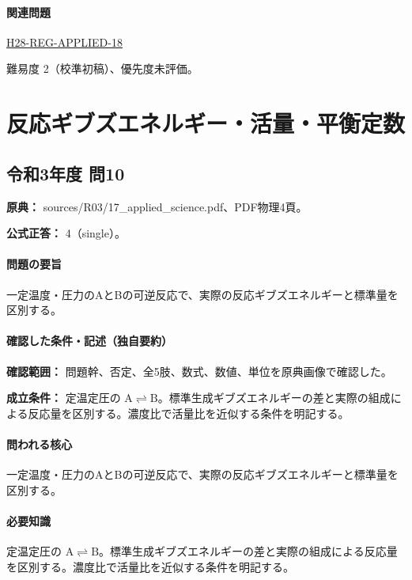 \paragraph{関連問題} \hyperref[q:h28-reg-applied-18]{H28-REG-APPLIED-18}

\par 難易度 2（校準初稿）、優先度未評価。

\section{反応ギブズエネルギー・活量・平衡定数}

\subsection{令和3年度 問10}
\label{q:r03-reg-applied-10}

\noindent\textbf{原典：} sources/R03/17\_applied\_science.pdf、PDF物理4頁。

\textbf{公式正答：} 4（single）。

\paragraph{問題の要旨} 一定温度・圧力のAとBの可逆反応で、実際の反応ギブズエネルギーと標準量を区別する。

\paragraph{確認した条件・記述（独自要約）}\mbox{}\par

\noindent\textbf{確認範囲：} 問題幹、否定、全5肢、数式、数値、単位を原典画像で確認した。\par

\noindent\textbf{成立条件：} 定温定圧の \(\mathrm{A\rightleftharpoons B}\)。標準生成ギブズエネルギーの差と実際の組成による反応量を区別する。濃度比で活量比を近似する条件を明記する。\par

\paragraph{問われる核心} 一定温度・圧力のAとBの可逆反応で、実際の反応ギブズエネルギーと標準量を区別する。

\paragraph{必要知識} 定温定圧の \(\mathrm{A\rightleftharpoons B}\)。標準生成ギブズエネルギーの差と実際の組成による反応量を区別する。濃度比で活量比を近似する条件を明記する。


